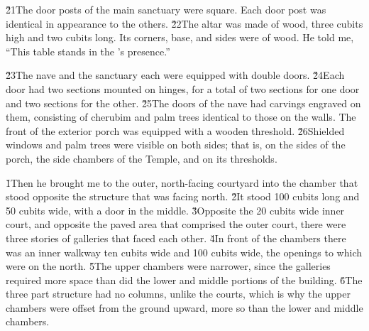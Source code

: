 \v{21}The door posts of the main sanctuary were square. Each door post was identical in appearance to the others. \v{22}The altar was made of wood, three cubits high and two cubits long. Its corners, base, and sides were of wood. He told me, ``This table stands in the 's presence.''

\v{23}The nave and the sanctuary each were equipped with double doors. \v{24}Each door had two sections mounted on hinges, for a total of two sections for one door and two sections for the other. \v{25}The doors of the nave had carvings engraved on them, consisting of cherubim and palm trees identical to those on the walls. The front of the exterior porch was equipped with a wooden threshold. \v{26}Shielded windows and palm trees were visible on both sides; that is, on the sides of the porch, the side chambers of the Temple, and on its thresholds.

\v{1}Then he brought me to the outer, north-facing courtyard into the chamber that stood opposite the structure that was facing north. \v{2}It stood 100 cubits long and 50 cubits wide, with a door in the middle. \v{3}Opposite the 20 cubits wide inner court, and opposite the paved area that comprised the outer court, there were three stories of galleries that faced each other. \v{4}In front of the chambers there was an inner walkway ten cubits wide and 100 cubits wide, the openings to which were on the north. \v{5}The upper chambers were narrower, since the galleries required more space than did the lower and middle portions of the building. \v{6}The three part structure had no columns, unlike the courts, which is why the upper chambers were offset from the ground upward, more so than the lower and middle chambers.

